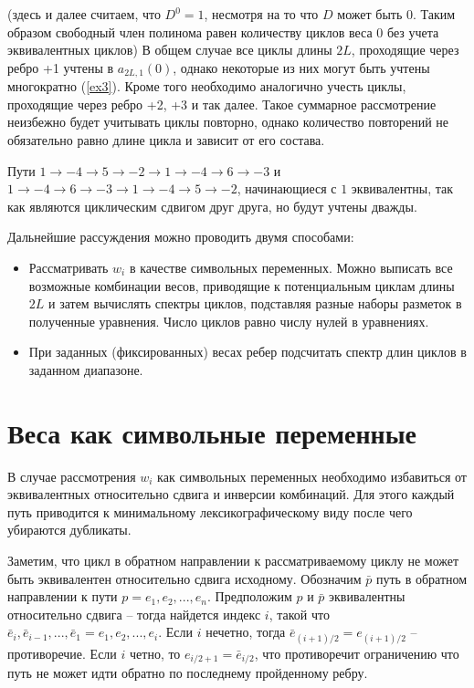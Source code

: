 (здесь и далее считаем, что $D^0=1$, несмотря на то что $D$ может быть $0$. Таким образом
свободный член полинома равен количеству циклов веса $0$ без учета эквивалентных циклов)
В общем случае все циклы длины $2L$, проходящие через ребро +1 учтены в $a_{2L,1}(0)$, однако
некоторые из них могут быть учтены многократно (\ref{ex3}). Кроме того необходимо аналогично учесть
циклы, проходящие через ребро +2, +3 и так далее. Такое суммарное рассмотрение неизбежно
будет учитывать циклы повторно, однако количество повторений не обязательно равно длине цикла и
зависит от его состава.
\begin{example} \label{ex3}

 Пути $1 \to -4 \to 5 \to -2 \to 1 \to -4 \to 6 \to -3$ и $1 \to -4 \to 6 \to -3 \to 1 \to -4 \to 5 \to -2$,
начинающиеся с $1$ эквивалентны, так как являются циклическим сдвигом друг друга, но будут учтены дважды. 
\end{example}

Дальнейшие рассуждения можно проводить двумя способами:
\begin{itemize}
  \item
  Рассматривать $w_i$ в качестве символьных переменных. 
Можно выписать все возможные комбинации весов, приводящие к потенциальным 
циклам длины $2L$ и затем вычислять спектры циклов, подставляя разные 
наборы разметок в полученные уравнения. Число циклов равно числу нулей в уравнениях.  
\item
  При заданных (фиксированных) весах ребер подсчитать спектр длин циклов в заданном диапазоне.
\end{itemize}

\section{Веса как символьные переменные}
В случае рассмотрения $w_i$ как символьных переменных необходимо избавиться от эквивалентных
относительно сдвига и инверсии комбинаций. Для этого каждый путь приводится к минимальному 
лексикографическому виду после чего убираются дубликаты. 

Заметим, что цикл в обратном направлении
к рассматриваемому циклу не может быть эквивалентен относительно сдвига исходному.
Обозначим $\bar{p}$ путь в обратном направлении к пути $p=e_1,e_2,...,e_n$. 
Предположим $p$ и $\bar{p}$ эквивалентны относительно сдвига -- тогда найдется индекс $i$, такой что
$\bar{e}_i, \bar{e}_{i-1}, ..., \bar{e}_1 = e_1, e_2, ..., e_i$.  Если $i$ нечетно, тогда $\bar{e}_{(i + 1)/2} = e_{(i+1)/2}$ -- противоречие.
 Если $i$ четно, то $e_{i/2 + 1}=\bar{e}_{i/2}$, что противоречит ограничению что путь не может
идти обратно по последнему пройденному ребру.

